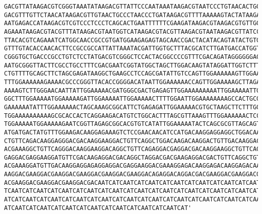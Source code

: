 \documentclass[11pt]{article}
\begin{document}
\begin{tcolorbox}[breakable, size=fbox, boxrule=.5pt, pad at break*=1mm, opacityfill=0]
\begin{Verbatim}[commandchars=\\\{\}]
GACGTTATAAGACGTCGGGTAAATATAAGACGTTATTCCCAATAAATAAGACGTAATCCCTGTAACACTGGAAGTGATAA
GACGTTTGTTCTAACATAAGACGTTGTAACTGCCCTAACCCTGATAAGACGTTTTAAAAAGTACTATAAGACGTTCGAGG
AATGAGACCATAAGACGTCGTCCCTCCCTCAGCACTGAATTTTTTCGAAGATAAGACGTAAGACGTGTTGGTTTATCGTT
AGAAATAAGACGTACGTTTATAAGACGTAATGGTCATAAGACGTACGTTAAGACGTAATAAGACGTTATCCATCCCAAAA
TTACACGTCAGAAATCATGGCAACCGCCGTGATGGAAGAGAGTAGCAACCGACTACATACAGTATACTGTGGGCAGACTC
GTTTGTACACCAACACTTCCGCCGCCATTATTAAATACGATTGGTGCTTTACGCATCTTGATGACCATGGTTACTCACCT
CGGGTGCTGACCCGCCTGTCTCCTATGACGTCGGGCTCCACTACGGCCCCGTTTCGACAGATAGGGGGGAGTTGACCTCG
AATGCGGGTTACTTCGCCTGCCTTTCGACGAATCGGTATGGCTAGCTTGGACAAGTATAGGATTGGTCTTTCAAGCTGCA
CTGTTTTGCAGCTTCTAGCGAGATAAGGCTGAAGCCTCCAGCGATATTGTCCAGTTGGAAAAAAGTTGGAAAAATGGGGG
TTTGGAAAAAAGAAAACGCCCGGGTTACACCGGGGACATAATTGGAAAAAACCAGTTGGAAAAAGCTTAGAAAGCTTGGA
AAAAGTCTTGGGAACAATTATTGGAAAAACGATGGGCGACTGAGAGTTGGAAAAAAAAATTGGAAAAATTGGAAAAACGT
GGCTTTGGAAAAATGGAAAAAGATTGGAAAAATTGGAAAAACTTTTGGAATTGGAAAAAAAAGCCACTGCGGGTGCTTTG
GAAAAAATATTTGGAAAAAACTAGCAAAGCGGCATTCTGAGAGATTGGAAAAACGTGCTAAGCTTCTTTGGAAAAAGAAT
TGGAAAAAAAAAAGCGCACCACTCAGGAAGACATGTCTGGCACTTTAGCGTTAAAGTTTGGAAAAAACTCCTCCCACATT
TGGAAAAATGGAAAAAGAATCGGTTAGAGCGGCACGTGTCATATTGGAAAAATACTCAGCGCGTTAGCAGTTGGAAAAAA
ATGATGACTATGTTTGGAAGACAAGGAGAAAGTCTCCGAACAACATCCATGACAAGGAGGAGGCTGGACAAGGATTCAGG
CTGTTCAGACAAGGAGGGACGACAAGGAAGGACTGTTCAGGCTGGACAAGACAAGGACTGTTGACAAGGACAGGACAAGG
ACGAAAGGCTGTTCAGGGACAAGGAAGGACAGGCTGTTCAGAGGACGAGGACGACAAGGAAGGCTGTTCAGGCTGTTCAG
GAGGACGAGGAAGGATGTTCGACAAGAGGACGACAGGCTAGGACGACGAAGAGGACGACTGTTCAGGCTGTAGGACGAGG
ACGAAAGGATGTTGACAAGGAGGAGAGGAGGACGAGGAAGGACGAAAGGAGACAAGGAGACAAGGAGACAAGGAAGGACG
AAGGACGAAGGACGAAGGACGAAGGACGAAGGACGAAGGACAGAGGACAGGACGACGAAGGACGAAGGACGAAGGACAGG
ACGAAGGACGAAGGACGAAGGACGACAATCATCAATCATCAATCATCAATCATCAATCATCAATCATCAATCATCAATCA
TCAATCATCAATCATCAATCATCAATCATCAATCATCAATCATCAATCATCAATCATCAATCATCAATCATCAATCATCA
ATCATCAATCATCAATCATCAATCATCAATCATCAATCATCAATCATCAATCATCAATCATCAATCATCAATCATCAATC
ATCAATCATCAATCATCAATCATCAATCATCAATCATCAATCATCAATCAT'
\end{Verbatim}
\end{tcolorbox}
        
\end{document}
